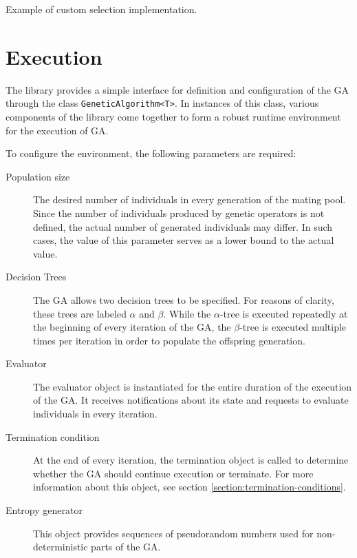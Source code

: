 \begin{listing}[ht]
	\caption{Example of custom selection implementation.}
	\label{listing:custom-selection}
\end{listing}

\section{Execution}
The library provides a simple interface for definition and configuration of the GA through the class \texttt{GeneticAlgorithm<T>}. In instances of this class, various components of the library come together to form a robust runtime environment for the execution of GA.

To configure the environment, the following parameters are required:
~
\begin{description}
	\item[Population size]
	The desired number of individuals in every generation of the mating pool. Since the number of individuals produced by genetic operators is not defined, the actual number of generated individuals may differ. In such cases, the value of this parameter serves as a lower bound to the actual value.

	\item[Decision Trees]
	The GA allows two decision trees to be specified. For reasons of clarity, these trees are labeled $\alpha$ and $\beta$. While the $\alpha$-tree is executed repeatedly at the beginning of every iteration of the GA, the $\beta$-tree is executed multiple times per iteration in order to populate the offspring generation.

	\item[Evaluator]
	The evaluator object is instantiated for the entire duration of the execution of the GA. It receives notifications about its state and requests to evaluate individuals in every iteration.
	\todo %

	\item[Termination condition]
	At the end of every iteration, the termination object is called to determine whether the GA should continue execution or terminate. For more information about this object, see section \ref{section:termination-conditions}.

	\item[Entropy generator]
	This object provides sequences of pseudorandom numbers used for non-deterministic parts of the GA.
\end{description}

